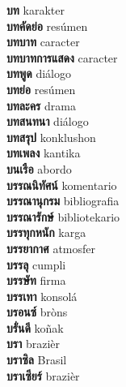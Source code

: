 \textbf{ บท  } karakter \\
\textbf{ บทคัดย่อ  } resúmen \\
\textbf{ บทบาท  } caracter \\
\textbf{ บทบาทการแสดง  } caracter \\
\textbf{ บทพูด  } diálogo \\
\textbf{ บทย่อ  } resúmen \\
\textbf{ บทละคร  } drama \\
\textbf{ บทสนทนา  } diálogo \\
\textbf{ บทสรุป  } konklushon \\
\textbf{ บทเพลง  } kantika \\
\textbf{ บนเรือ  } abordo \\
\textbf{ บรรณนิทัศน์  } komentario \\
\textbf{ บรรณานุกรม  } bibliografia \\
\textbf{ บรรณารักษ์  } bibliotekario \\
\textbf{ บรรทุกหนัก  } karga \\
\textbf{ บรรยากาศ  } atmosfer \\
\textbf{ บรรลุ  } cumpli \\
\textbf{ บรรษัท  } firma \\
\textbf{ บรรเทา  } konsolá \\
\textbf{ บรอนซ์  } bròns \\
\textbf{ บรั่นดี  } koñak \\
\textbf{ บรา  } brazièr \\
\textbf{ บราซิล  } Brasil \\
\textbf{ บราเซียร์  } brazièr \\
